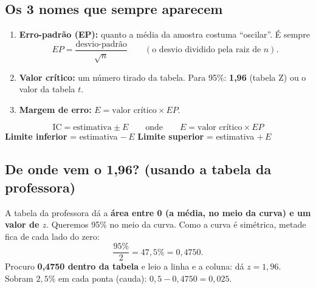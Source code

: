 \documentclass[12pt,a4paper]{article}
\begin{document}
\subsection*{Os 3 nomes que sempre aparecem}
\begin{enumerate}[leftmargin=*]
  \item \textbf{Erro-padrão (EP):} quanto a média da amostra costuma ``oscilar''. É sempre
  \[ EP = \frac{\text{desvio-padrão}}{\sqrt{n}} \qquad(\text{o desvio dividido pela raiz de } n). \]
  \item \textbf{Valor crítico:} um número tirado da tabela. Para 95\%: \textbf{1,96} (tabela Z) ou o valor da tabela $t$.
  \item \textbf{Margem de erro:} $E = \text{valor crítico} \times EP$.
\end{enumerate}

\begin{tcolorbox}[colback=verde!8,colframe=verde,title=A receita de TODO intervalo de confiança]
\[
\boxed{\ \text{IC} = \text{estimativa} \pm E \qquad\text{onde}\qquad E = \text{valor crítico}\times EP\ }
\]
\textbf{Limite inferior} = estimativa $-\,E$ \qquad \textbf{Limite superior} = estimativa $+\,E$
\end{tcolorbox}

\newpage
\subsection*{De onde vem o 1,96? (usando a tabela da professora)}
A tabela da professora dá a \textbf{área entre 0 (a média, no meio da curva) e um valor de $z$}.
Queremos 95\% no meio da curva. Como a curva é simétrica, metade fica de cada lado do zero:
\[
\frac{95\%}{2} = 47,5\% = 0,4750 .
\]
Procuro \textbf{0,4750 dentro da tabela} e leio a linha e a coluna: dá $z = 1,96$.
Sobram $2,5\%$ em cada ponta (cauda): $0,5 - 0,4750 = 0,025$.

\begin{center}
\end{center}
\end{document}
